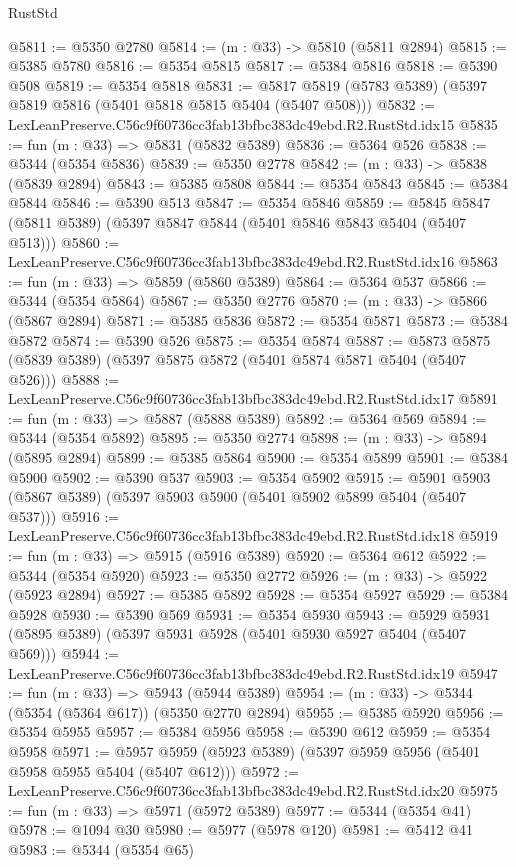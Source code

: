 \begin{lexlean}{RustStd}
\begin{coremodule}
@5811 := @5350 @2780
@5814 := (m : @33) -> @5810 (@5811 @2894)
@5815 := @5385 @5780
@5816 := @5354 @5815
@5817 := @5384 @5816
@5818 := @5390 @508
@5819 := @5354 @5818
@5831 := @5817 @5819 (@5783 @5389) (@5397 @5819 @5816 (@5401 @5818 @5815 @5404 (@5407 @508)))
@5832 := LexLeanPreserve.C56c9f60736cc3fab13bfbc383dc49ebd.R2.RustStd.idx15
@5835 := fun (m : @33) => @5831 (@5832 @5389)
@5836 := @5364 @526
@5838 := @5344 (@5354 @5836)
@5839 := @5350 @2778
@5842 := (m : @33) -> @5838 (@5839 @2894)
@5843 := @5385 @5808
@5844 := @5354 @5843
@5845 := @5384 @5844
@5846 := @5390 @513
@5847 := @5354 @5846
@5859 := @5845 @5847 (@5811 @5389) (@5397 @5847 @5844 (@5401 @5846 @5843 @5404 (@5407 @513)))
@5860 := LexLeanPreserve.C56c9f60736cc3fab13bfbc383dc49ebd.R2.RustStd.idx16
@5863 := fun (m : @33) => @5859 (@5860 @5389)
@5864 := @5364 @537
@5866 := @5344 (@5354 @5864)
@5867 := @5350 @2776
@5870 := (m : @33) -> @5866 (@5867 @2894)
@5871 := @5385 @5836
@5872 := @5354 @5871
@5873 := @5384 @5872
@5874 := @5390 @526
@5875 := @5354 @5874
@5887 := @5873 @5875 (@5839 @5389) (@5397 @5875 @5872 (@5401 @5874 @5871 @5404 (@5407 @526)))
@5888 := LexLeanPreserve.C56c9f60736cc3fab13bfbc383dc49ebd.R2.RustStd.idx17
@5891 := fun (m : @33) => @5887 (@5888 @5389)
@5892 := @5364 @569
@5894 := @5344 (@5354 @5892)
@5895 := @5350 @2774
@5898 := (m : @33) -> @5894 (@5895 @2894)
@5899 := @5385 @5864
@5900 := @5354 @5899
@5901 := @5384 @5900
@5902 := @5390 @537
@5903 := @5354 @5902
@5915 := @5901 @5903 (@5867 @5389) (@5397 @5903 @5900 (@5401 @5902 @5899 @5404 (@5407 @537)))
@5916 := LexLeanPreserve.C56c9f60736cc3fab13bfbc383dc49ebd.R2.RustStd.idx18
@5919 := fun (m : @33) => @5915 (@5916 @5389)
@5920 := @5364 @612
@5922 := @5344 (@5354 @5920)
@5923 := @5350 @2772
@5926 := (m : @33) -> @5922 (@5923 @2894)
@5927 := @5385 @5892
@5928 := @5354 @5927
@5929 := @5384 @5928
@5930 := @5390 @569
@5931 := @5354 @5930
@5943 := @5929 @5931 (@5895 @5389) (@5397 @5931 @5928 (@5401 @5930 @5927 @5404 (@5407 @569)))
@5944 := LexLeanPreserve.C56c9f60736cc3fab13bfbc383dc49ebd.R2.RustStd.idx19
@5947 := fun (m : @33) => @5943 (@5944 @5389)
@5954 := (m : @33) -> @5344 (@5354 (@5364 @617)) (@5350 @2770 @2894)
@5955 := @5385 @5920
@5956 := @5354 @5955
@5957 := @5384 @5956
@5958 := @5390 @612
@5959 := @5354 @5958
@5971 := @5957 @5959 (@5923 @5389) (@5397 @5959 @5956 (@5401 @5958 @5955 @5404 (@5407 @612)))
@5972 := LexLeanPreserve.C56c9f60736cc3fab13bfbc383dc49ebd.R2.RustStd.idx20
@5975 := fun (m : @33) => @5971 (@5972 @5389)
@5977 := @5344 (@5354 @41)
@5978 := @1094 @30
@5980 := @5977 (@5978 @120)
@5981 := @5412 @41
@5983 := @5344 (@5354 @65)

\end{coremodule}
\end{lexlean}
